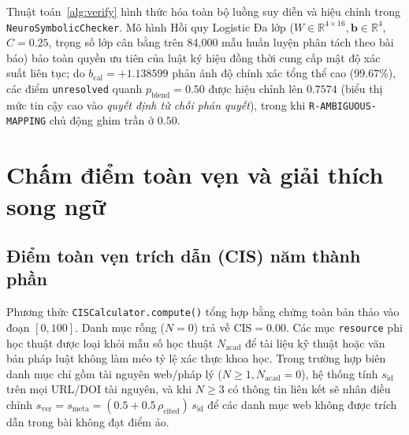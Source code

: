 Thuật toán~\ref{alg:verify} hình thức hóa toàn bộ luồng suy diễn và hiệu chỉnh trong \texttt{NeuroSymbolicChecker}. Mô hình Hồi quy Logistic Đa lớp ($W \in \mathbb{R}^{4 \times 16}, \mathbf{b} \in \mathbb{R}^4$, $C = 0.25$, trọng số lớp cân bằng trên 84,000 mẫu huấn luyện phân tách theo bài báo) bảo toàn quyền ưu tiên của luật ký hiệu đồng thời cung cấp mật độ xác suất liên tục; do $b_{\text{cal}} = +1.138599$ phản ánh độ chính xác tổng thể cao ($99.67\%$), các điểm \texttt{unresolved} quanh $p_{\text{blend}} = 0.50$ được hiệu chỉnh lên $0.7574$ (biểu thị mức tin cậy cao vào \emph{quyết định từ chối phán quyết}), trong khi \texttt{R-AMBIGUOUS-MAPPING} chủ động ghim trần ở $0.50$.

\section{Chấm điểm toàn vẹn và giải thích song ngữ}

\subsection{Điểm toàn vẹn trích dẫn (CIS) năm thành phần}

Phương thức \texttt{CISCalculator.compute()} tổng hợp bằng chứng toàn bản thảo vào đoạn $[0, 100]$. Danh mục rỗng ($N = 0$) trả về $\text{CIS} = 0.00$. Các mục \texttt{resource} phi học thuật được loại khỏi mẫu số học thuật $N_{\text{acad}}$ để tài liệu kỹ thuật hoặc văn bản pháp luật không làm méo tỷ lệ xác thực khoa học. Trong trường hợp biên danh mục chỉ gồm tài nguyên web/pháp lý ($N \ge 1, N_{\text{acad}} = 0$), hệ thống tính $s_{\text{id}}$ trên mọi URL/DOI tài nguyên, và khi $N \ge 3$ có thông tin liên kết sẽ nhân điều chỉnh $s_{\text{ver}} = s_{\text{meta}} = (0.5 + 0.5\,\rho_{\text{cited}})\,s_{\text{id}}$ để các danh mục web không được trích dẫn trong bài không đạt điểm ảo.


